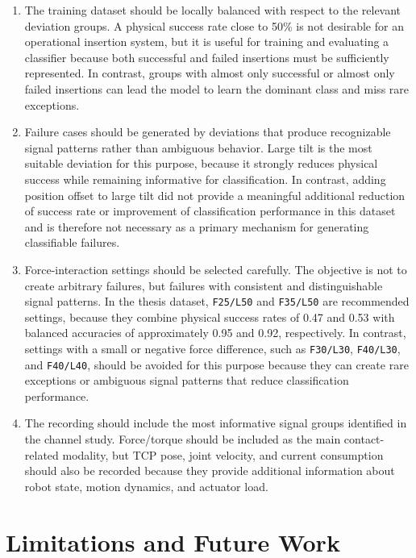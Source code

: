 \begin{enumerate}
\item The training dataset should be locally balanced with respect to the relevant deviation groups. A physical success rate close to 50\% is not desirable for an operational insertion system, but it is useful for training and evaluating a classifier because both successful and failed insertions must be sufficiently represented. In contrast, groups with almost only successful or almost only failed insertions can lead the model to learn the dominant class and miss rare exceptions.

\item Failure cases should be generated by deviations that produce recognizable signal patterns rather than ambiguous behavior. Large tilt is the most suitable deviation for this purpose, because it strongly reduces physical success while remaining informative for classification. In contrast, adding position offset to large tilt did not provide a meaningful additional reduction of success rate or improvement of classification performance in this dataset and is therefore not necessary as a primary mechanism for generating classifiable failures.

\item Force-interaction settings should be selected carefully. The objective is not to create arbitrary failures, but failures with consistent and distinguishable signal patterns. In the thesis dataset, \texttt{F25/L50} and \texttt{F35/L50} are recommended settings, because they combine physical success rates of 0.47 and 0.53 with balanced accuracies of approximately 0.95 and 0.92, respectively. In contrast, settings with a small or negative force difference, such as \texttt{F30/L30}, \texttt{F40/L30}, and \texttt{F40/L40}, should be avoided for this purpose because they can create rare exceptions or ambiguous signal patterns that reduce classification performance.

\item The recording should include the most informative signal groups identified in the channel study. Force/torque should be included as the main contact-related modality, but TCP pose, joint velocity, and current consumption should also be recorded because they provide additional information about robot state, motion dynamics, and actuator load.

\end{enumerate}



\section{Limitations and Future Work}
\label{sec:limitations_future_work}

